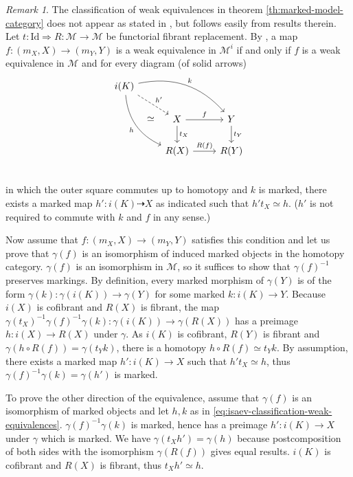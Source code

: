 \documentclass[a4paper]{article}
\theoremstyle{remark}
\newtheorem{remark}[theorem]{Remark}
\theoremstyle{definition}
\begin{document}
\begin{remark}
  The classification of weak equivalences in theorem \ref{th:marked-model-category} does not appear as stated in \cite{marked-objects}, but follows easily from results therein.
  Let $t : \mathrm{Id} \Rightarrow R : \mathcal{M} \rightarrow \mathcal{M}$ be functorial fibrant replacement.
  By \cite[lemma 2.5]{marked-objects}, a map $f : (m_X, X) \rightarrow (m_Y, Y)$ is a weak equivalence in $\mathcal{M}^i$ if and only if $f$ is a weak equivalence in $\mathcal{M}$ and for every diagram (of solid arrows)
  \begin{equation}
    \label{eq:isaev-classification-weak-equivalences}
    \begin{tikzcd}
      i(K) \arrow[drr, bend left, "k"] \arrow[ddr, bend right, "h"'] \arrow[dr, dashed, "h'"] \arrow[ddr, phantom, "\simeq"] \\
      & X \arrow[d, "t_X"] \arrow[r, "f"] & Y \arrow[d, "t_Y"]  \\
      & R(X) \arrow[r, "R(f)"] & R(Y)  \\
    \end{tikzcd}
  \end{equation}
  in which the outer square commutes up to homotopy and $k$ is marked, there exists a marked map $h' : i(K) \dashrightarrow X$ as indicated such that $h' t_X \simeq h$.
  ($h'$ is not required to commute with $k$ and $f$ in any sense.)

  Now assume that $f : (m_X, X) \rightarrow (m_Y, Y)$ satisfies this condition and let us prove that $\gamma(f)$ is an isomorphism of induced marked objects in the homotopy category.
  $\gamma(f)$ is an isomorphism in $\mathcal{M}$, so it suffices to show that $\gamma(f)^{-1}$ preserves markings.
  By definition, every marked morphism of $\gamma(Y)$ is of the form $\gamma(k) : \gamma(i(K)) \rightarrow \gamma(Y)$ for some marked $k : i(K) \rightarrow Y$.
  Because $i(X)$ is cofibrant and $R(X)$ is fibrant, the map $\gamma(t_X)^{-1} \gamma(f)^{-1} \gamma(k) : \gamma(i(K)) \rightarrow \gamma(R(X))$ has a preimage $h : i(X) \rightarrow R(X)$ under $\gamma$.
  As $i(K)$ is cofibrant, $R(Y)$ is fibrant and $\gamma(h \circ R(f)) = \gamma(t_Y k)$, there is a homotopy $h \circ R(f) \simeq t_Y k$.
  By assumption, there exists a marked map $h' : i(K) \rightarrow X$ such that $h' t_X \simeq h$, thus $\gamma(f)^{-1} \gamma(k) = \gamma(h')$ is marked.

  To prove the other direction of the equivalence, assume that $\gamma(f)$ is an isomorphism of marked objects and let $h, k$ as in \eqref{eq:isaev-classification-weak-equivalences}.
  $\gamma(f)^{-1} \gamma(k)$ is marked, hence has a preimage $h' : i(K) \rightarrow X$ under $\gamma$ which is marked.
  We have $\gamma(t_X h') = \gamma(h)$ because postcomposition of both sides with the isomorphism $\gamma(R(f))$ gives equal results.
  $i(K)$ is cofibrant and $R(X)$ is fibrant, thus $t_X h' \simeq h$.
\end{remark}
\end{document}
